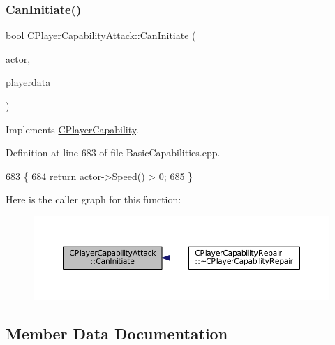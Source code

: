 \subsubsection{\texorpdfstring{Can\+Initiate()}{CanInitiate()}}
{\footnotesize\ttfamily bool C\+Player\+Capability\+Attack\+::\+Can\+Initiate (\begin{DoxyParamCaption}\item[{std\+::shared\+\_\+ptr$<$ \hyperlink{classCPlayerAsset}{C\+Player\+Asset} $>$}]{actor,  }\item[{std\+::shared\+\_\+ptr$<$ \hyperlink{classCPlayerData}{C\+Player\+Data} $>$}]{playerdata }\end{DoxyParamCaption})\hspace{0.3cm}{\ttfamily [virtual]}}



Implements \hyperlink{classCPlayerCapability_aa83b1e1fcaff2985c378132d679154ea}{C\+Player\+Capability}.



Definition at line 683 of file Basic\+Capabilities.\+cpp.


\begin{DoxyCode}
683                                                                                                            
                \{
684     \textcolor{keywordflow}{return} actor->Speed() > 0;
685 \}
\end{DoxyCode}
Here is the caller graph for this function\+:
\nopagebreak
\begin{figure}[H]
\begin{center}
\leavevmode
\includegraphics[width=350pt]{classCPlayerCapabilityAttack_ab1cda67a8e637a90accf03d1581d4072_icgraph}
\end{center}
\end{figure}


\subsection{Member Data Documentation}
\hypertarget{classCPlayerCapabilityAttack_a22b5c69229cdc25c3f289de947db148d}{}\label{classCPlayerCapabilityAttack_a22b5c69229cdc25c3f289de947db148d} 
